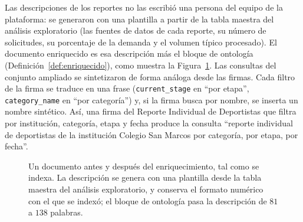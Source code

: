 \documentclass[11pt,letterpaper]{article}
\numberwithin{equation}{section}
\begin{document}
Las descripciones de los reportes no las escribió una persona del equipo de la plataforma: se generaron con una plantilla a partir de la tabla maestra del análisis exploratorio (las fuentes de datos de cada reporte, su número de solicitudes, su porcentaje de la demanda y el volumen típico procesado). El documento enriquecido es esa descripción más el bloque de ontología (Definición~\ref{def:enriquecido}), como muestra la Figura~\ref{fig:antes-despues}. Las consultas del conjunto ampliado se sintetizaron de forma análoga desde las firmas. Cada filtro de la firma se traduce en una frase (\texttt{current\_stage} en ``por etapa'', \texttt{category\_name} en ``por categoría'') y, si la firma busca por nombre, se inserta un nombre sintético. Así, una firma del Reporte Individual de Deportistas que filtra por institución, categoría, etapa y fecha produce la consulta ``reporte individual de deportistas de la institución Colegio San Marcos por categoría, por etapa, por fecha''.

\begin{figure}[htbp]
\centering
{}
\caption{Un documento antes y después del enriquecimiento, tal como se indexa. La descripción se genera con una plantilla desde la tabla maestra del análisis exploratorio, y conserva el formato numérico con el que se indexó; el bloque de ontología pasa la descripción de $81$ a $138$ palabras.}
\label{fig:antes-despues}
\end{figure}
\end{document}
